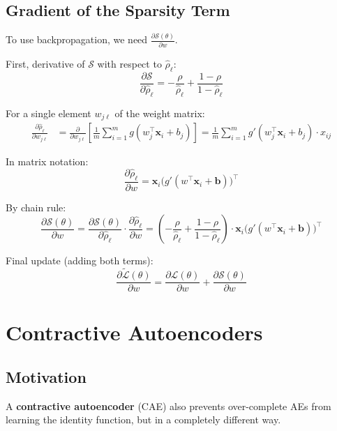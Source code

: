 \documentclass[12pt,a4paper]{article}
\newcommand{\vx}{\mathbf{x}}
\newcommand{\vb}{\mathbf{b}}
\newcommand{\Loss}{\mathcal{L}}
\newcommand{\Reg}{\mathcal{S}}
\begin{document}
\subsection{Gradient of the Sparsity Term}

To use backpropagation, we need $\frac{\partial\Reg(\theta)}{\partial w}$.

First, derivative of $\Reg$ with respect to $\hat{\rho}_\ell$:
\[
  \frac{\partial\Reg}{\partial\hat{\rho}_\ell}
  = -\frac{\rho}{\hat{\rho}_\ell} + \frac{1-\rho}{1-\hat{\rho}_\ell}
\]

For a single element $w_{j\ell}$ of the weight matrix:
\begin{align*}
  \frac{\partial\hat{\rho}_\ell}{\partial w_{j\ell}}
  &= \frac{\partial}{\partial w_{j\ell}}\left[\frac{1}{m}\sum_{i=1}^{m}g(w_j^\top\vx_i + b_j)\right]
  = \frac{1}{m}\sum_{i=1}^{m}g'(w_j^\top\vx_i + b_j)\cdot x_{ij}
\end{align*}

In matrix notation:
\[
  \frac{\partial\hat{\rho}_\ell}{\partial w}
  = \vx_i\bigl(g'(w^\top\vx_i + \vb)\bigr)^\top
\]

By chain rule:
\[
  \frac{\partial\Reg(\theta)}{\partial w}
  = \frac{\partial\Reg(\theta)}{\partial\hat{\rho}_\ell}
    \cdot \frac{\partial\hat{\rho}_\ell}{\partial w}
  = \left(-\frac{\rho}{\hat{\rho}_\ell} + \frac{1-\rho}{1-\hat{\rho}_\ell}\right)
    \cdot \vx_i\bigl(g'(w^\top\vx_i + \vb)\bigr)^\top
\]

Final update (adding both terms):
\[
  \frac{\partial\tilde{\Loss}(\theta)}{\partial w}
  = \frac{\partial\Loss(\theta)}{\partial w}
  + \frac{\partial\Reg(\theta)}{\partial w}
\]

\section{Contractive Autoencoders}

\subsection{Motivation}

A \textbf{contractive autoencoder} (CAE) also prevents over-complete AEs from learning the identity function, but in a completely different way.
\end{document}
